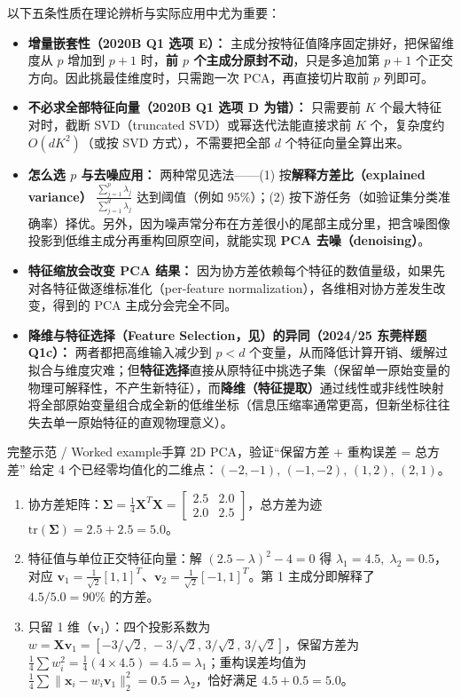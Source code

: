 以下五条性质在理论辨析与实际应用中尤为重要：
\begin{itemize}
\item \textbf{增量嵌套性（2020B Q1 选项 E）：} 主成分按特征值降序固定排好，把保留维度从 $p$ 增加到 $p+1$ 时，\textbf{前 $p$ 个主成分原封不动}，只是多追加第 $p+1$ 个正交方向。因此挑最佳维度时，只需跑一次 PCA，再直接切片取前 $p$ 列即可。
\item \textbf{不必求全部特征向量（2020B Q1 选项 D 为错）：} 只需要前 $K$ 个最大特征对时，截断 SVD（truncated SVD）或幂迭代法能直接求前 $K$ 个，复杂度约 $O(d K^2)$（或按 SVD 方式），不需要把全部 $d$ 个特征向量全算出来。
\item \textbf{怎么选 $p$ 与去噪应用：} 两种常见选法——(1) 按\textbf{解释方差比（explained variance）} $\frac{\sum_{j=1}^p \lambda_j}{\sum_{j=1}^d \lambda_j}$ 达到阈值（例如 95\%）；(2) 按下游任务（如验证集分类准确率）择优。另外，因为噪声常分布在方差很小的尾部主成分里，把含噪图像投影到低维主成分再重构回原空间，就能实现 \textbf{PCA 去噪（denoising）}。
\item \textbf{特征缩放会改变 PCA 结果：} 因为协方差依赖每个特征的数值量级，如果先对各特征做逐维标准化（per-feature normalization），各维相对协方差发生改变，得到的 PCA 主成分会完全不同。
\item \textbf{降维与特征选择（Feature Selection，见）的异同（2024/25 东莞样题 Q1c）：} 两者都把高维输入减少到 $p<d$ 个变量，从而降低计算开销、缓解过拟合与维度灾难；但\textbf{特征选择}直接从原特征中挑选子集（保留单一原始变量的物理可解释性，不产生新特征），而\textbf{降维（特征提取）}通过线性或非线性映射将全部原始变量组合成全新的低维坐标（信息压缩率通常更高，但新坐标往往失去单一原始特征的直观物理意义）。
\end{itemize}

\begin{StudyBlock}{完整示范 / Worked example}{手算 2D PCA，验证“保留方差 + 重构误差 = 总方差”}
给定 4 个已经零均值化的二维点：$(-2,-1),\,(-1,-2),\,(1,2),\,(2,1)$。
\begin{enumerate}
\item 协方差矩阵：$\boldsymbol{\Sigma} = \frac{1}{4}\mathbf{X}^T\mathbf{X} = \begin{bmatrix}2.5 & 2.0\\ 2.0 & 2.5\end{bmatrix}$，总方差为迹 $\mathrm{tr}(\boldsymbol{\Sigma}) = 2.5 + 2.5 = 5.0$。
\item 特征值与单位正交特征向量：解 $(2.5-\lambda)^2 - 4 = 0$ 得 $\lambda_1 = 4.5,\; \lambda_2 = 0.5$，对应 $\mathbf{v}_1 = \frac{1}{\sqrt{2}}[1,1]^T$、$\mathbf{v}_2 = \frac{1}{\sqrt{2}}[-1,1]^T$。第 1 主成分即解释了 $4.5 / 5.0 = 90\%$ 的方差。
\item 只留 1 维（$\mathbf{v}_1$）：四个投影系数为 $w = \mathbf{X}\mathbf{v}_1 = [-3/\sqrt{2},\,-3/\sqrt{2},\,3/\sqrt{2},\,3/\sqrt{2}]$，保留方差为 $\frac{1}{4}\sum w_i^2 = \frac{1}{4}(4\times 4.5) = 4.5 = \lambda_1$；重构误差均值为 $\frac{1}{4}\sum \|\mathbf{x}_i - w_i\mathbf{v}_1\|_2^2 = 0.5 = \lambda_2$，恰好满足 $4.5 + 0.5 = 5.0$。
\end{enumerate}
\end{StudyBlock}

